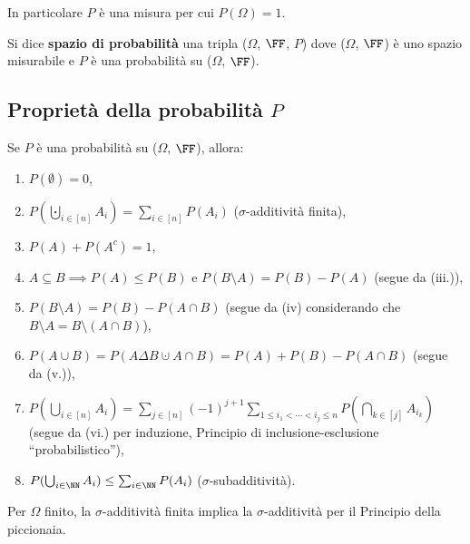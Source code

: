 \begin{multicols*}{2}
\begin{definition}
        In particolare $P$ è una misura per cui $P(\Omega) = 1$.
    \end{definition}

    \begin{definition}
        Si dice \textbf{spazio di probabilità} una tripla
        ($\Omega$, $\FF$, $P$) dove ($\Omega$, $\FF$) è
        uno spazio misurabile e $P$ è una
        probabilità su ($\Omega$, $\FF$).
    \end{definition}

    \subsection{Proprietà della probabilità \texorpdfstring{$P$}{P}}

    \begin{proposition}[Proprietà di $P$]
        Se $P$ è una probabilità su ($\Omega$, $\FF$), allora:

        \begin{enumerate}[(i.)]
            \item $P(\emptyset) = 0$,
            \item $P(\bigcupdot_{i \in [n]} A_i) = \sum_{i \in [n]} P(A_i)$ ($\sigma$-additività finita),
            \item $P(A) + P(A^c) = 1$,
            \item $A \subseteq B \implies P(A) \leq P(B)$ e $P(B \setminus A) = P(B) - P(A)$ (segue da (iii.)),
            \item $P(B \setminus A) = P(B) - P(A \cap B)$ (segue da (iv) considerando che $B \setminus A = B \setminus (A \cap B)$),
            \item $P(A \cup B) = P(A \Delta B \cupdot A \cap B) = P(A) + P(B) - P(A \cap B)$ (segue da (v.)),
            \item $P(\bigcup_{i \in [n]} A_i) = \sum_{j \in [n]} (-1)^{j+1} \sum_{1 \leq i_1 < \cdots < i_j \leq n} P(\bigcap_{k \in [j]} A_{i_{k}})$ (segue da (vi.) per induzione, Principio di inclusione-esclusione ``probabilistico''),
            \item $P(\bigcup_{i \in \NN} A_i) \leq \sum_{i \in \NN} P(A_i)$ ($\sigma$-subadditività).
        \end{enumerate}
    \end{proposition}

    \begin{remark}
        Per $\Omega$ finito, la $\sigma$-additività finita implica la $\sigma$-additività per il Principio della piccionaia.
    \end{remark}


\end{multicols*}

